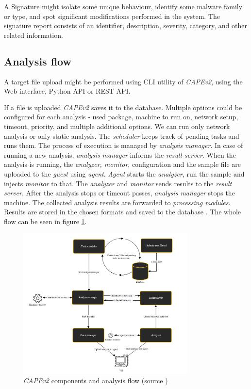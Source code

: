 A Signature might isolate some unique behaviour, identify some malware family or type, and spot significant modifications performed in the system. The signature report consists of an identifier, description, severity, category, and other related information.

\subsection{Analysis flow}
A target file upload might be performed using CLI utility of \emph{CAPEv2}, using the Web interface,  Python API or REST API.

If a file is uploaded \emph{CAPEv2} saves it to the database. Multiple options could be configured for each analysis - used package, machine to run on, network setup, timeout, priority, and multiple additional options. We can run only network analysis or only static analysis. The \emph{scheduler} keeps track of pending tasks and runs them. The process of execution is managed by \emph{analysis manager}. In case of running a new analysis, \emph{analysis manager} informs the \emph{result server}. When the analysis is running, the \emph{analyzer, monitor}, configuration and the sample file are uploaded to the \emph{guest} using \emph{agent}. \emph{Agent} starts the \emph{analyzer}, run the sample and injects \emph{monitor} to that. The \emph{analyzer} and \emph{monitor} sends results to the \emph{result server}. After the analysis stops or timeout passes, \emph{analysis manager} stops the machine. The collected analysis results are forwarded to \emph{processing modules}. Results are stored in the chosen formats and saved to the database \cite{CuckooSa10:online}. The whole flow can be seen in figure \ref{fig:capeflow}.

\begin{figure}[h]
  \centering
  \includegraphics[width=0.8\textwidth]{figures/flow.png}
  \caption{\emph{CAPEv2} components and analysis flow (source \cite{CuckooSa10:online})}
  \label{fig:capeflow}
\end{figure}


